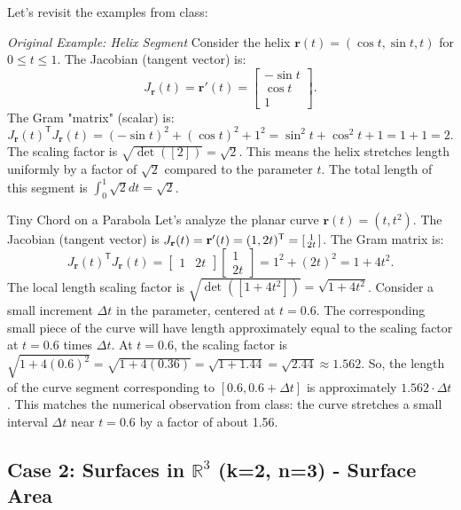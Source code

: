 \documentclass[12pt]{article}
\theoremstyle{definition} %
\theoremstyle{plain} %
\theoremstyle{remark} %
\begin{document}
Let's revisit the examples from class:

\textit{Original Example: Helix Segment}
Consider the helix $\mathbf{r}(t) = (\cos t, \sin t, t)$ for $0 \leq t \leq 1$.
The Jacobian (tangent vector) is:
\[
    J_{\mathbf{r}}(t) = \mathbf{r}'(t) = \begin{bmatrix} -\sin t \\ \cos t \\ 1 \end{bmatrix}.
\]
The Gram "matrix" (scalar) is:
\[
    J_{\mathbf{r}}(t)^{\mathsf{T}} J_{\mathbf{r}}(t) = (-\sin t)^2 + (\cos t)^2 + 1^2 = \sin^2 t + \cos^2 t + 1 = 1 + 1 = 2.
\]
The scaling factor is $\sqrt{\det([2])} = \sqrt{2}$. This means the helix stretches length uniformly by a factor of $\sqrt{2}$ compared to the parameter $t$. The total length of this segment is $\int_0^1 \sqrt{2} dt = \sqrt{2}$.

\begin{example}{{Tiny Chord on a Parabola}}
\label{parabola_chord}
Let's analyze the planar curve $\mathbf{r}(t) = (t, t^2)$.
The Jacobian (tangent vector) is $J_{\mathbf{r}}(t) = \mathbf{r}'(t) = (1, 2t)^{\mathsf{T}} = \begin{bsmallmatrix} 1 \\ 2t \end{bsmallmatrix}$.
The Gram matrix is:
\[ J_{\mathbf{r}}(t)^{\mathsf{T}} J_{\mathbf{r}}(t) = \begin{bmatrix} 1 & 2t \end{bmatrix} \begin{bmatrix} 1 \\ 2t \end{bmatrix} = 1^2 + (2t)^2 = 1 + 4t^2. \]
The local length scaling factor is $\sqrt{\det([1+4t^2])} = \sqrt{1+4t^2}$.
Consider a small increment $\Delta t$ in the parameter, centered at $t=0.6$. The corresponding small piece of the curve will have length approximately equal to the scaling factor at $t=0.6$ times $\Delta t$.
At $t=0.6$, the scaling factor is $\sqrt{1 + 4(0.6)^2} = \sqrt{1 + 4(0.36)} = \sqrt{1 + 1.44} = \sqrt{2.44} \approx 1.562$.
So, the length of the curve segment corresponding to $[0.6, 0.6+\Delta t]$ is approximately $1.562 \cdot \Delta t$. This matches the numerical observation from class: the curve stretches a small interval $\Delta t$ near $t=0.6$ by a factor of about 1.56.
\end{example}

\subsection{Case 2: Surfaces in \texorpdfstring{$\mathbb{R}^3$}{R^3} (k=2, n=3) - Surface Area}
\end{document}
